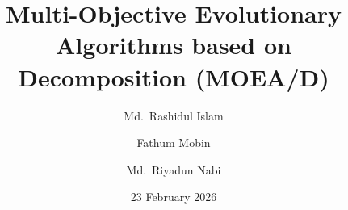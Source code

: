 \documentclass[aspectratio=169]{beamer}
\title[MOEA/D]{Multi-Objective Evolutionary Algorithms based on Decomposition (MOEA/D)}
\author[Islam, Mobin, Nabi]{Md.\ Rashidul Islam \and Fathum Mobin \and Md.\ Riyadun Nabi}
\date[February 2026]{23 February 2026}
\begin{document}

\begin{frame}
  \titlepage
\end{frame}











\end{document}
